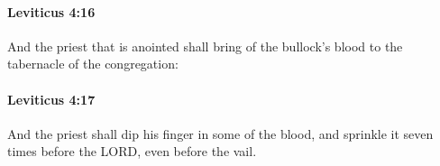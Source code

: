		\paragraph{Leviticus 4:16} %
			\label{LEVITICUS-4-16}

			And the priest that is anointed shall bring of the bullock’s blood to the tabernacle of the congregation:


		\paragraph{Leviticus 4:17} %
			\label{LEVITICUS-4-17}

			And the priest shall dip his finger in some of the blood, and sprinkle it seven times before the LORD, even before the vail.


